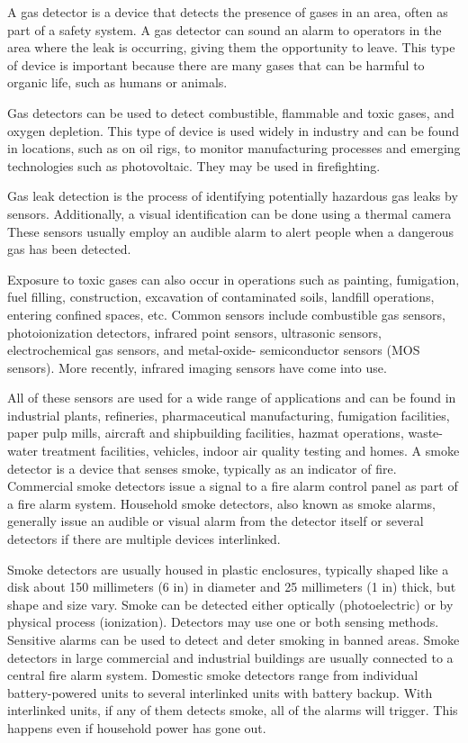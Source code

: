 \documentclass[12pt,a4paper]{report}
\begin{document}
\noindent          

\noindent 

\noindent A gas detector is a device that detects the presence of gases in an area, often as part of a safety system. A gas detector can sound an alarm to operators in the area where the leak is occurring, giving them the opportunity to leave. This type of device is important because there are many gases that can be harmful to organic life, such as humans or animals.

\noindent Gas detectors can be used to detect combustible, flammable and toxic gases, and oxygen depletion. This type of device is used widely in industry and can be found in locations, such as on oil rigs, to monitor manufacturing processes and emerging technologies such as photovoltaic. They may be used in firefighting.

\noindent Gas leak detection is the process of identifying potentially hazardous gas leaks by sensors. Additionally, a visual identification can be done using a thermal camera These sensors usually employ an audible alarm to alert people when a dangerous gas has been detected. 

\noindent Exposure to toxic gases can also occur in operations such as painting, fumigation, fuel filling, construction, excavation of contaminated soils, landfill operations, entering confined spaces, etc. Common sensors include combustible gas sensors, photoionization detectors, infrared point sensors, ultrasonic sensors, electrochemical gas sensors, and metal-oxide- semiconductor sensors (MOS sensors). More recently, infrared imaging sensors have come into use. 

\noindent All of these sensors are used for a wide range of applications and can be found in industrial plants, refineries, pharmaceutical manufacturing, fumigation facilities, paper pulp mills, aircraft and shipbuilding facilities, hazmat operations, waste-water treatment facilities, vehicles, indoor air quality testing and homes. A smoke detector is a device that senses smoke, typically as an indicator of fire. Commercial smoke detectors issue a signal to a fire alarm control panel as part of a fire alarm system. Household smoke detectors, also known as smoke alarms, generally issue an audible or visual alarm from the detector itself or several detectors if there are multiple devices interlinked. 

\noindent Smoke detectors are usually housed in plastic enclosures, typically shaped like a disk about 150 millimeters (6 in) in diameter and 25 millimeters (1 in) thick, but shape and size vary. Smoke can be detected either optically (photoelectric) or by physical process (ionization). Detectors may use one or both sensing methods. Sensitive alarms can be used to detect and deter smoking in banned areas. Smoke detectors in large commercial and industrial buildings are usually connected to a central fire alarm system. Domestic smoke detectors range from individual battery-powered units to several interlinked units with battery backup. With interlinked units, if any of them detects smoke, all of the alarms will trigger. This happens even if household power has gone out.
\end{document}
